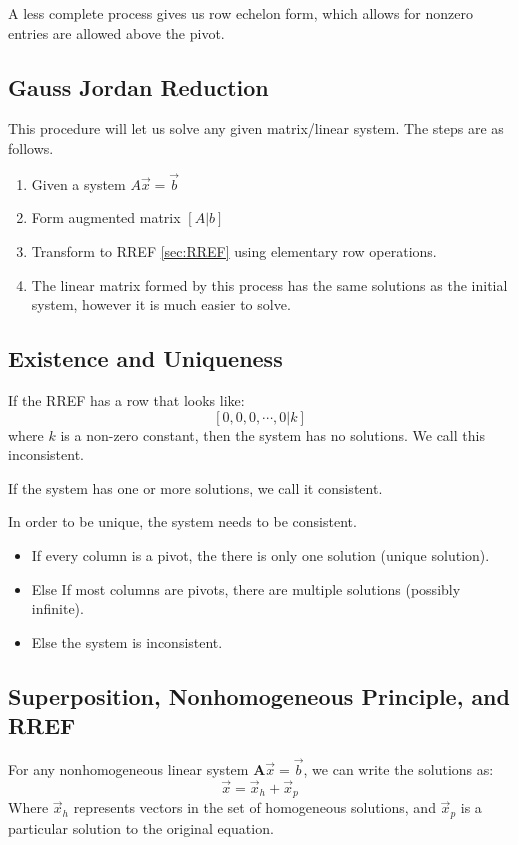     A less complete process gives us row echelon form, which allows for nonzero entries are allowed above the pivot.

    \subsection{Gauss Jordan Reduction}
    This procedure will let us solve any given matrix/linear system. The steps are as follows.

    \begin{enumerate}
        \item Given a system $A\vec{x} = \vec{b}$
        \item Form augmented matrix $[A|b]$
        \item Transform to RREF \eqref{sec:RREF} using elementary row operations.
        \item The linear matrix formed by this process has the same solutions as the initial system, however it is much easier to solve.
    \end{enumerate}

    \subsection{Existence and Uniqueness}
    If the RREF has a row that looks like:
    \[
        [0, 0, 0, \cdots, 0 | k]
    \]
    where $k$ is a non-zero constant, then the system has no solutions. We call this inconsistent.

    If the system has one or more solutions, we call it consistent.

    In order to be unique, the system needs to be consistent.
        \begin{itemize}
            \item If every column is a pivot, the there is only one solution (unique solution).
            \item Else If most columns are pivots, there are multiple solutions (possibly infinite).
            \item Else the system is inconsistent.
        \end{itemize}

    \subsection{Superposition, Nonhomogeneous Principle, and RREF}
    For any nonhomogeneous linear system $\mathbf{A}\vec{x} = \vec{b}$, we can write the solutions as:
    \[
        \vec{x} = \vec{x}_h + \vec{x}_p
    \]
    Where $\vec{x}_h$ represents vectors in the set of homogeneous solutions, and $\vec{x}_p$ is a particular solution to the original equation.

